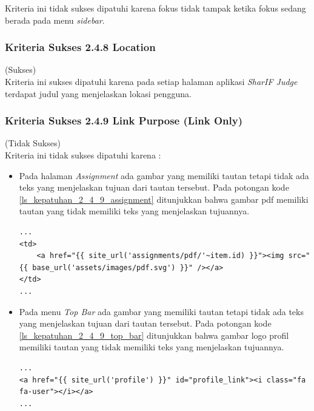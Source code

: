 \documentclass[a4paper,twoside]{article}
\begin{document}
\begin{enumerate}
		Kriteria ini tidak sukses dipatuhi karena fokus tidak tampak ketika fokus sedang berada pada menu \textit{sidebar}.
		
		\subsubsection*{Kriteria Sukses 2.4.8 Location}
		\label{subsubsec:kepatuhan_kriteria_2.4.8}
		(Sukses) \\
		
		Kriteria ini sukses dipatuhi karena pada setiap halaman aplikasi \textit{SharIF Judge} terdapat judul yang menjelaskan lokasi pengguna.
		
		\subsubsection*{Kriteria Sukses 2.4.9 Link Purpose (Link Only)}
		\label{subsubsec:kepatuhan_kriteria_2.4.9}
		(Tidak Sukses) \\
		
		Kriteria ini tidak sukses dipatuhi karena :
		\begin{itemize}
			\item Pada halaman \textit{Assignment} ada gambar yang memiliki tautan tetapi tidak ada teks yang menjelaskan tujuan dari tautan tersebut. Pada potongan kode \ref{ls_kepatuhan_2_4_9_assignment} ditunjukkan bahwa gambar pdf memiliki tautan yang tidak memiliki teks yang menjelaskan tujuannya.
			\begin{lstlisting}[basicstyle=\ttfamily, frame=single,
			columns=fullflexible, keepspaces=true, breaklines=true, label=ls_kepatuhan_2_4_9_assignment, caption=Kriteria Sukses 2.4.9 - Gambar PDF]
...
<td>
	<a href="{{ site_url('assignments/pdf/'~item.id) }}"><img src="{{ base_url('assets/images/pdf.svg') }}" /></a>
</td>
...
			\end{lstlisting}
			
			\item Pada menu \textit{Top Bar} ada gambar yang memiliki tautan tetapi tidak ada teks yang menjelaskan tujuan dari tautan tersebut. Pada potongan kode \ref{ls_kepatuhan_2_4_9_top_bar} ditunjukkan bahwa gambar logo profil memiliki tautan yang tidak memiliki teks yang menjelaskan tujuannya.
			\begin{lstlisting}[basicstyle=\ttfamily, frame=single,
			columns=fullflexible, keepspaces=true, breaklines=true, label=ls_kepatuhan_2_4_9_top_bar, caption=Kriteria Sukses 2.4.9 - Gambar Logo Profile]
...
<a href="{{ site_url('profile') }}" id="profile_link"><i class="fa fa-user"></i></a>
...
			\end{lstlisting}
			

\end{itemize}
\end{enumerate}
\end{document}
